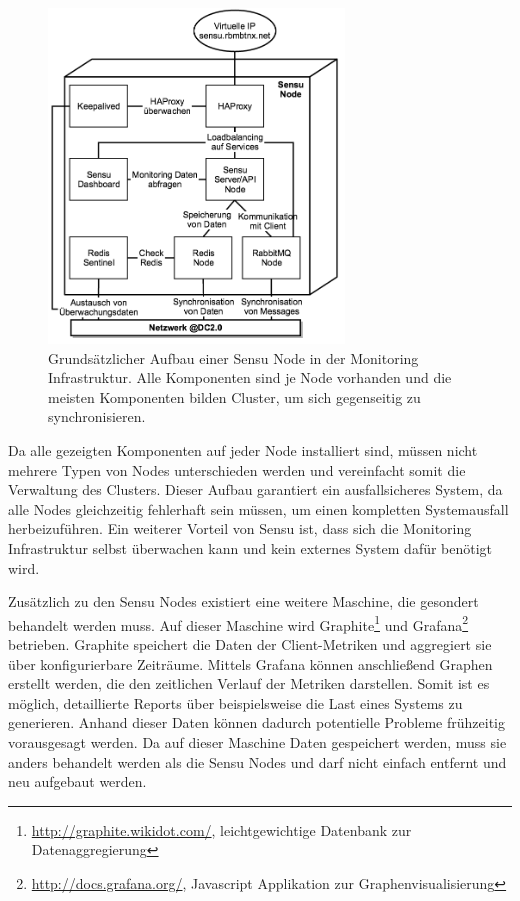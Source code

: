 \begin{figure}[ht]
	\centering
	\includegraphics[width=0.7\textwidth]{img/sensu_node.png}
	\caption[Aufbau einer Sensu Node]{Grundsätzlicher Aufbau einer Sensu Node in der Monitoring Infrastruktur. Alle Komponenten sind je Node vorhanden und die meisten Komponenten bilden Cluster, um sich gegenseitig zu synchronisieren.}
	\label{fig:sensu_node}
\end{figure}

Da alle gezeigten Komponenten auf jeder Node installiert sind, müssen nicht mehrere Typen von Nodes unterschieden werden und vereinfacht somit die Verwaltung des Clusters. Dieser Aufbau garantiert ein ausfallsicheres System, da alle Nodes gleichzeitig fehlerhaft sein müssen, um einen kompletten Systemausfall herbeizuführen. Ein weiterer Vorteil von Sensu ist, dass sich die Monitoring Infrastruktur selbst überwachen kann und kein externes System dafür benötigt wird.

Zusätzlich zu den Sensu Nodes existiert eine weitere Maschine, die gesondert behandelt werden muss. Auf dieser Maschine wird Graphite\footnote{\url{http://graphite.wikidot.com/}, leichtgewichtige Datenbank zur Datenaggregierung} und Grafana\footnote{\url{http://docs.grafana.org/}, Javascript Applikation zur Graphenvisualisierung} betrieben. Graphite speichert die Daten der Client-Metriken und aggregiert sie über konfigurierbare Zeiträume. Mittels Grafana können anschließend Graphen erstellt werden, die den zeitlichen Verlauf der Metriken darstellen. Somit ist es möglich, detaillierte Reports über beispielsweise die Last eines Systems zu generieren. Anhand dieser Daten können dadurch potentielle Probleme frühzeitig vorausgesagt werden. Da auf dieser Maschine Daten gespeichert werden, muss sie anders behandelt werden als die Sensu Nodes und darf nicht einfach entfernt und neu aufgebaut werden.

